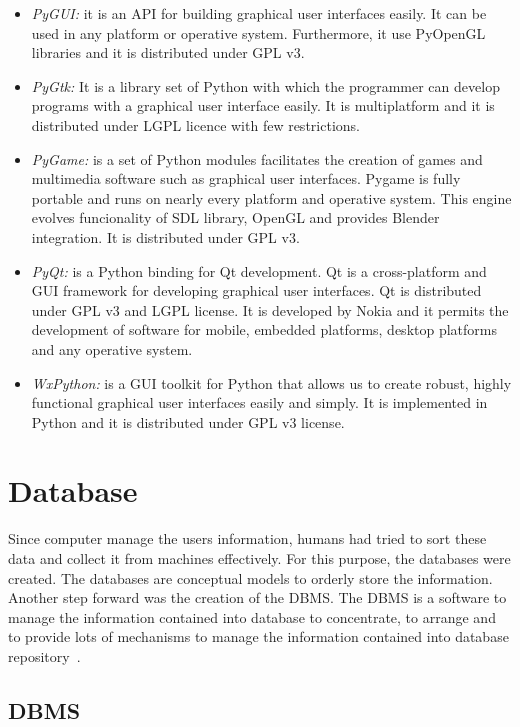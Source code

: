 \begin{itemize}
\item \emph {PyGUI:} it is an \ac{API} for building graphical user interfaces
  easily. It can be used in any platform or
  operative system. Furthermore, it use  PyOpenGL libraries and it is distributed under \ac{GPL} v3.
\item \emph{PyGtk:} It is a library set of Python with which the programmer can
  develop  programs with a graphical user interface easily. It is multiplatform
  and it is distributed under \ac{LGPL} licence with few restrictions.
\item \emph{PyGame:} is a set of Python modules facilitates the creation of games and
  multimedia software such as graphical user interfaces. Pygame is fully portable and
  runs on nearly every platform and operative system. This engine evolves
  funcionality of \ac{SDL} library, OpenGL and provides Blender integration. It is
  distributed under \ac{GPL} v3.
\item \emph{PyQt:} is a Python binding for Qt development. Qt is a
  cross-platform  and \ac{GUI} framework for  developing graphical user interfaces. Qt
  is distributed under \ac{GPL} v3 and \ac{LGPL} license. It is developed by Nokia and it
  permits the development of software for mobile, embedded platforms, desktop platforms
  and any operative system.
\item \emph{WxPython:} is a \ac{GUI} toolkit for Python that allows us to create
  robust, highly functional graphical user interfaces easily and simply. It is
  implemented in Python and it is distributed under \ac{GPL} v3 license.
\end{itemize}


\section{Database}
Since computer manage the users information, humans had tried to sort these data
and collect it from machines effectively. For this purpose, the databases were
created. The databases are conceptual models to orderly store the information. Another step forward was the creation of the \ac{DBMS}. The \ac{DBMS}
is a software to manage the information contained into database to concentrate,
to arrange and to provide lots of mechanisms to manage the information contained
into database repository~\cite{Database}.

\subsection{DBMS}

